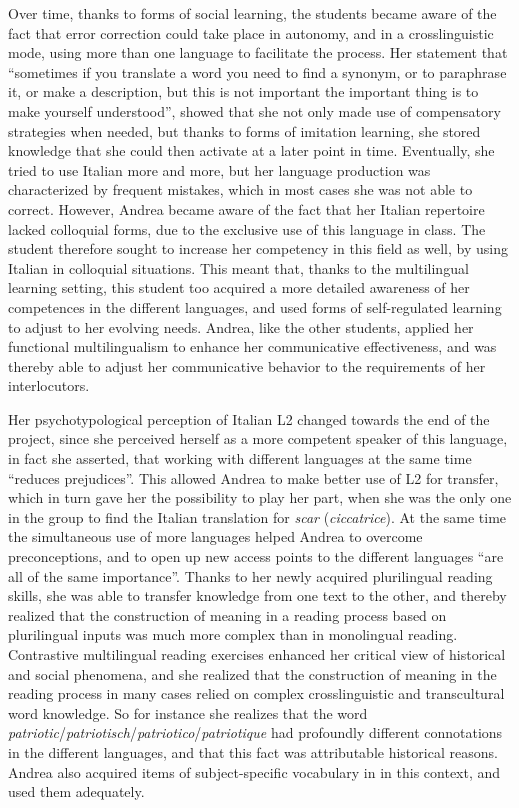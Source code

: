 \documentclass[output=paper]{../langscibook}
\begin{document}
Over time, thanks to forms of social learning, the students became aware of the fact that error correction could take place in autonomy, and in a crosslinguistic mode, using more than one language to facilitate the process. Her statement that “sometimes if you translate a word you need to find a synonym, or to paraphrase it, or make a description, but this is not important the important thing is to make yourself understood”, showed that she not only made use of compensatory strategies when needed, but thanks to forms of imitation learning, she stored knowledge that she could then activate at a later point in time. Eventually, she tried to use Italian more and more, but her language production was characterized by frequent mistakes, which in most cases she was not able to correct. However, Andrea became aware of the fact that her Italian repertoire lacked colloquial forms, due to the exclusive use of this language in class. The student therefore sought to increase her competency in this field as well, by using Italian in colloquial situations. This meant that, thanks to the multilingual learning setting, this student too acquired a more detailed awareness of her competences in the different languages, and used forms of self-regulated learning to adjust to her evolving needs. Andrea, like the other students, applied her functional multilingualism to enhance her communicative effectiveness, and was thereby able to adjust her communicative behavior to the requirements of her interlocutors. 

Her psychotypological perception of Italian L2 changed towards the end of the project, since she perceived herself as a more competent speaker of this language, in fact she asserted, that working with different languages at the same time “reduces prejudices”. This allowed Andrea to make better use of L2 for transfer, which in turn gave her the possibility to play her part, when she was the only one in the group to find the Italian translation for \textit{scar} (\textit{ciccatrice}). At the same time the simultaneous use of more languages helped Andrea to overcome preconceptions, and to open up new access points to the different languages “are all of the same importance”. Thanks to her newly acquired plurilingual reading skills, she was able to transfer knowledge from one text to the other, and thereby realized that the construction of meaning in a reading process based on plurilingual inputs was much more complex than in monolingual reading. Contrastive multilingual reading exercises enhanced her critical view of historical and social phenomena, and she realized that the construction of meaning in the reading process in many cases relied on complex crosslinguistic and transcultural word knowledge. So for instance she realizes that the word \emph{patriotic}\slash\emph{patriotisch}\slash\emph{patriotico}\slash\emph{patriotique} had profoundly different connotations in the different languages, and that this fact was attributable historical reasons. Andrea also acquired items of subject-specific vocabulary in in this context, and used them adequately. 
\end{document}
